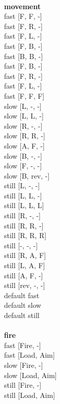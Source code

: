\ \\ {\bf movement } \\
fast [F, F, -] \\
fast [F, R, -] \\
fast [F, L, -] \\
fast [F, B, -] \\
fast [B, B, -] \\
fast [F, B, -] \\
fast [F, R, -] \\
fast [F, L, -] \\
fast [F, F, F] \\
slow [L, -, -] \\
slow [L, L, -] \\
slow [R, -, -] \\
slow [R, R, -] \\
slow [A, F, -] \\
slow [B, -, -] \\
slow [F, -, -] \\
slow [B, rev, -] \\
still [L, -, -] \\
still [L, L, -] \\
still [L, L, L] \\
still [R, -, -] \\
still [R, R, -] \\
still [R, R, R] \\
still [-, -, -] \\
still [R, A, F] \\
still [L, A, F] \\
still [A, F, -] \\
still [rev, -, -] \\
default fast \\
default slow \\
default still \\
\ \\ {\bf fire } \\
fast [Fire, -] \\
fast [Load, Aim] \\
slow [Fire, -] \\
slow [Load, Aim] \\
still [Fire, -] \\
still [Load, Aim] \\


